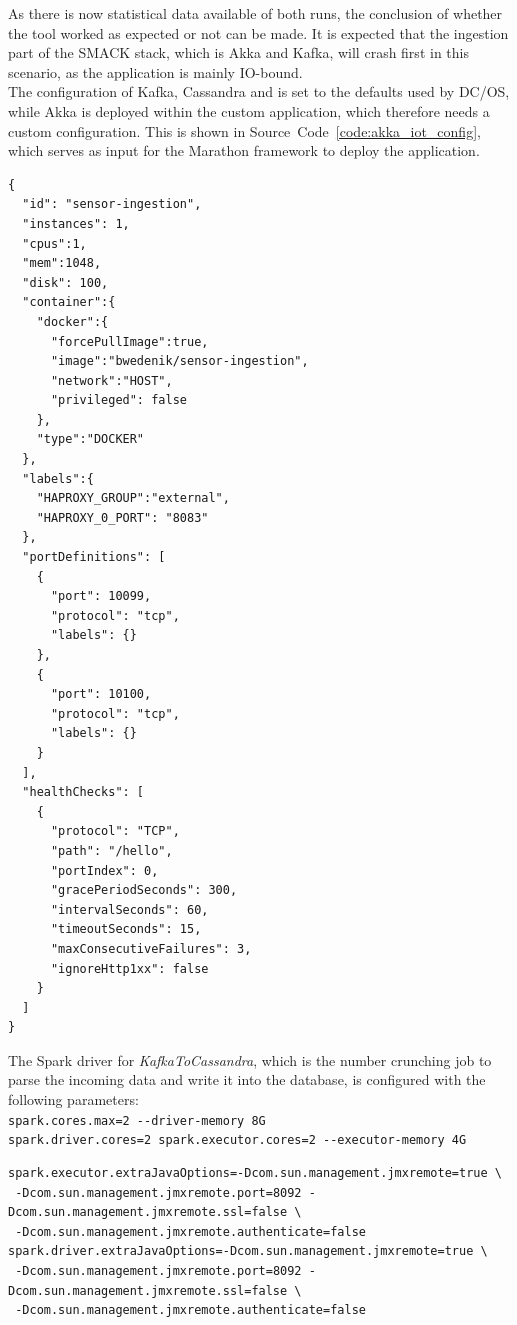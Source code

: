 As there is now statistical data available of both runs, the conclusion of whether the tool worked as expected or not can be made.
It is expected that the ingestion part of the SMACK stack, which is Akka and Kafka, will crash first in this scenario, as the application is mainly IO-bound.\\

The configuration of Kafka, Cassandra and is set to the defaults used by DC/OS, while Akka is deployed within the custom application, which therefore needs a custom configuration.
This is shown in Source~Code~\ref{code:akka_iot_config}, which serves as input for the Marathon framework to deploy the application.

\begin{code}
\begin{verbatim}
{
  "id": "sensor-ingestion",
  "instances": 1,
  "cpus":1,
  "mem":1048,
  "disk": 100,
  "container":{
    "docker":{
      "forcePullImage":true,
      "image":"bwedenik/sensor-ingestion",
      "network":"HOST",
      "privileged": false
    },
    "type":"DOCKER"
  },
  "labels":{
    "HAPROXY_GROUP":"external",
    "HAPROXY_0_PORT": "8083"
  },
  "portDefinitions": [
    {
      "port": 10099,
      "protocol": "tcp",
      "labels": {}
    },
    {
      "port": 10100,
      "protocol": "tcp",
      "labels": {}
    }
  ],
  "healthChecks": [
    {
      "protocol": "TCP",
      "path": "/hello",
      "portIndex": 0,
      "gracePeriodSeconds": 300,
      "intervalSeconds": 60,
      "timeoutSeconds": 15,
      "maxConsecutiveFailures": 3,
      "ignoreHttp1xx": false
    }
  ]
}
\end{verbatim}
\label{code:akka_iot_config}
\end{code}

The Spark driver for \textit{KafkaToCassandra}, which is the number crunching job to parse the incoming data and write it into the database, is configured with the following parameters:\\
\verb|spark.cores.max=2 --driver-memory 8G|\\
\verb|spark.driver.cores=2 spark.executor.cores=2 --executor-memory 4G|\\

\begin{minipage}{\linewidth}
\begin{code}
\begin{verbatim}
spark.executor.extraJavaOptions=-Dcom.sun.management.jmxremote=true \
 -Dcom.sun.management.jmxremote.port=8092 -Dcom.sun.management.jmxremote.ssl=false \
 -Dcom.sun.management.jmxremote.authenticate=false
spark.driver.extraJavaOptions=-Dcom.sun.management.jmxremote=true \
 -Dcom.sun.management.jmxremote.port=8092 -Dcom.sun.management.jmxremote.ssl=false \
 -Dcom.sun.management.jmxremote.authenticate=false
\end{verbatim}
\captionof{listing}{Spark JMX Deployment Configuration}
\label{code:spark_jmx_config}
\end{code}
\end{minipage}

